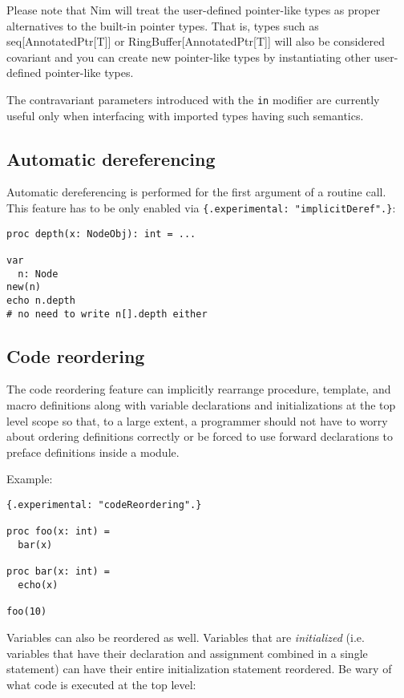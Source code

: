 Please note that Nim will treat the user-defined pointer-like types as
proper alternatives to the built-in pointer types. That is, types such
as {seq{[}AnnotatedPtr{[}T{]}{]}} or
{RingBuffer{[}AnnotatedPtr{[}T{]}{]}} will also be considered covariant
and you can create new pointer-like types by instantiating other
user-defined pointer-like types.

The contravariant parameters introduced with the \texttt{in} modifier
are currently useful only when interfacing with imported types having
such semantics.

\hypertarget{automatic-dereferencing}{%
\subsection{Automatic dereferencing}\label{automatic-dereferencing}}

Automatic dereferencing is performed for the first argument of a routine
call. This feature has to be only enabled via
\texttt{\{.experimental:\ "implicitDeref".\}}:

\begin{verbatim}
proc depth(x: NodeObj): int = ...

var
  n: Node
new(n)
echo n.depth
# no need to write n[].depth either
\end{verbatim}

\hypertarget{code-reordering}{%
\subsection{Code reordering}\label{code-reordering}}

The code reordering feature can implicitly rearrange procedure,
template, and macro definitions along with variable declarations and
initializations at the top level scope so that, to a large extent, a
programmer should not have to worry about ordering definitions correctly
or be forced to use forward declarations to preface definitions inside a
module.

Example:

\begin{verbatim}
{.experimental: "codeReordering".}

proc foo(x: int) =
  bar(x)

proc bar(x: int) =
  echo(x)

foo(10)
\end{verbatim}

Variables can also be reordered as well. Variables that are
\emph{initialized} (i.e. variables that have their declaration and
assignment combined in a single statement) can have their entire
initialization statement reordered. Be wary of what code is executed at
the top level:

